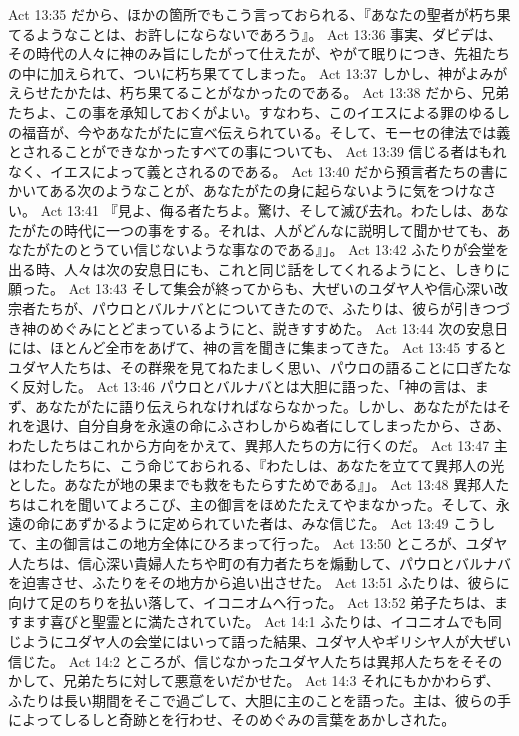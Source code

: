 Act 13:35  だから、ほかの箇所でもこう言っておられる、『あなたの聖者が朽ち果てるようなことは、お許しにならないであろう』。
Act 13:36  事実、ダビデは、その時代の人々に神のみ旨にしたがって仕えたが、やがて眠りにつき、先祖たちの中に加えられて、ついに朽ち果ててしまった。
Act 13:37  しかし、神がよみがえらせたかたは、朽ち果てることがなかったのである。
Act 13:38  だから、兄弟たちよ、この事を承知しておくがよい。すなわち、このイエスによる罪のゆるしの福音が、今やあなたがたに宣べ伝えられている。そして、モーセの律法では義とされることができなかったすべての事についても、
Act 13:39  信じる者はもれなく、イエスによって義とされるのである。
Act 13:40  だから預言者たちの書にかいてある次のようなことが、あなたがたの身に起らないように気をつけなさい。
Act 13:41  『見よ、侮る者たちよ。驚け、そして滅び去れ。わたしは、あなたがたの時代に一つの事をする。それは、人がどんなに説明して聞かせても、あなたがたのとうてい信じないような事なのである』」。
Act 13:42  ふたりが会堂を出る時、人々は次の安息日にも、これと同じ話をしてくれるようにと、しきりに願った。
Act 13:43  そして集会が終ってからも、大ぜいのユダヤ人や信心深い改宗者たちが、パウロとバルナバとについてきたので、ふたりは、彼らが引きつづき神のめぐみにとどまっているようにと、説きすすめた。
Act 13:44  次の安息日には、ほとんど全市をあげて、神の言を聞きに集まってきた。
Act 13:45  するとユダヤ人たちは、その群衆を見てねたましく思い、パウロの語ることに口ぎたなく反対した。
Act 13:46  パウロとバルナバとは大胆に語った、「神の言は、まず、あなたがたに語り伝えられなければならなかった。しかし、あなたがたはそれを退け、自分自身を永遠の命にふさわしからぬ者にしてしまったから、さあ、わたしたちはこれから方向をかえて、異邦人たちの方に行くのだ。
Act 13:47  主はわたしたちに、こう命じておられる、『わたしは、あなたを立てて異邦人の光とした。あなたが地の果までも救をもたらすためである』」。
Act 13:48  異邦人たちはこれを聞いてよろこび、主の御言をほめたたえてやまなかった。そして、永遠の命にあずかるように定められていた者は、みな信じた。
Act 13:49  こうして、主の御言はこの地方全体にひろまって行った。
Act 13:50  ところが、ユダヤ人たちは、信心深い貴婦人たちや町の有力者たちを煽動して、パウロとバルナバを迫害させ、ふたりをその地方から追い出させた。
Act 13:51  ふたりは、彼らに向けて足のちりを払い落して、イコニオムへ行った。
Act 13:52  弟子たちは、ますます喜びと聖霊とに満たされていた。
Act 14:1  ふたりは、イコニオムでも同じようにユダヤ人の会堂にはいって語った結果、ユダヤ人やギリシヤ人が大ぜい信じた。
Act 14:2  ところが、信じなかったユダヤ人たちは異邦人たちをそそのかして、兄弟たちに対して悪意をいだかせた。
Act 14:3  それにもかかわらず、ふたりは長い期間をそこで過ごして、大胆に主のことを語った。主は、彼らの手によってしるしと奇跡とを行わせ、そのめぐみの言葉をあかしされた。
